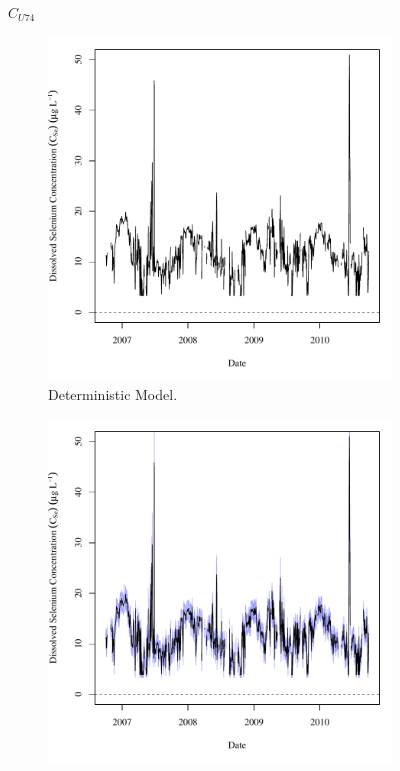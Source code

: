 \begin{linenumbers}
\subfiguremid
\begin{landscape}
	\begin{figure}
		$ C_{U74} $
		\begin{subfigure}{0.7\textwidth}
			\centering
			\includegraphics[width=\tableCustomSize]{"Figures/Results_USR/Deterministic/c TS CAN"}
			\caption{Deterministic Model.}
		\end{subfigure}%
		\begin{subfigure}{0.7\textwidth}
			\centering
			\includegraphics[width=\tableCustomSize]{"Figures/Results_USR/Stochastic/c TS CAN"}

\end{subfigure}
\end{figure}
\end{landscape}
\end{linenumbers}
